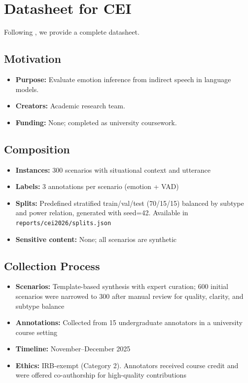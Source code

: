 \documentclass[twoside,11pt]{article}
\begin{document}


\clearpage

\appendix
\section{Datasheet for CEI}
\label{app:datasheet}

Following \citet{gebru2021datasheets}, we provide a complete datasheet.

\subsection{Motivation}
\begin{itemize}[leftmargin=*,noitemsep]
    \item \textbf{Purpose:} Evaluate emotion inference from indirect speech in language models.
    \item \textbf{Creators:} Academic research team.
    \item \textbf{Funding:} None; completed as university coursework.
\end{itemize}

\subsection{Composition}
\begin{itemize}[leftmargin=*,noitemsep]
    \item \textbf{Instances:} 300 scenarios with situational context and utterance
    \item \textbf{Labels:} 3 annotations per scenario (emotion + VAD)
    \item \textbf{Splits:} Predefined stratified train/val/test (70/15/15) balanced by subtype and power relation, generated with seed=42. Available in \texttt{reports/cei2026/splits.json}
    \item \textbf{Sensitive content:} None; all scenarios are synthetic
\end{itemize}

\subsection{Collection Process}
\begin{itemize}[leftmargin=*,noitemsep]
    \item \textbf{Scenarios:} Template-based synthesis with expert curation; 600 initial scenarios were narrowed to 300 after manual review for quality, clarity, and subtype balance
    \item \textbf{Annotations:} Collected from 15 undergraduate annotators in a university course setting
    \item \textbf{Timeline:} November--December 2025
    \item \textbf{Ethics:} IRB-exempt (Category 2). Annotators received course credit and were offered co-authorship for high-quality contributions
\end{itemize}
\end{document}
